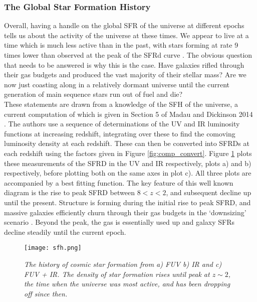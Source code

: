 \documentclass{literature}
\begin{document}
\subsubsection{The Global Star Formation History}\label{subsubsec:gsfh}
Overall, having a handle on the global SFR of the universe at different epochs tells us about the activity of the universe at these times. We appear to live at a time which is much less active than in the past, with stars forming at rate 9 times lower than observed at the peak of the SFRd curve \citep{Madau_2014}. The obvious question that needs to be answered is why this is the case. Have galaxies rifled through their gas budgets and produced the vast majority of their stellar mass? Are we now just coasting along in a relatively dormant universe until the current generation of main sequence stars run out of fuel and die? \\ 

These statements are drawn from a knowledge of the SFH of the universe, a current computation of which is given in Section 5 of Madau and Dickinson 2014 \citep{Madau_2014}. The authors use a sequence of determinations of the UV and IR luminosity functions at increasing redshift, integrating over these to find the comoving luminosity density at each redshift. These can then be converted into SFRDs at each redshift using the factors given in Figure \ref{fig:comp_convert}. Figure \ref{fig:sfh} plots these measurements of the SFRD in the UV and IR respectively, plots a) and b) respectively, before plotting both on the same axes in plot c). All three plots are accompanied by a best fitting function. The key feature of this well known diagram is the rise to peak SFRD between $8 < z < 2$, and subsequent decline up until the present. Structure is forming during the initial rise to peak SFRD, and massive galaxies efficiently churn through their gas budgets in the `downsizing' scenario \citep{Brooks2007}. Beyond the peak, the gas is essentially used up and galaxy SFRs decline steadily until the current epoch. \\ 

\begin{figure}[!htp]
\centering
\texttt{[image: sfh.png]}
\caption{\footnotesize{\emph{The history of cosmic star formation from a) FUV b) IR and c) FUV + IR. The density of star formation rises until peak at $z\sim 2$, the time when the universe was most active, and has been dropping off since then.}}}
\label{fig:sfh}
\end{figure} 
\end{document}
